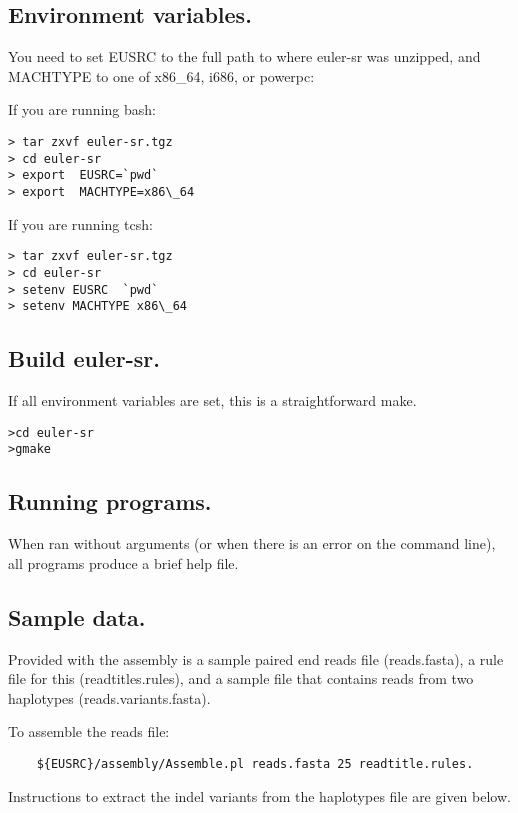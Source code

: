 \documentclass{article}[12pt]
\begin{document}
\subsection{ Environment variables.}

You need to set EUSRC to the full path to where euler-sr was unzipped,
and MACHTYPE to one of x86\_64, i686, or powerpc:

If you are running bash:


\begin{verbatim}
> tar zxvf euler-sr.tgz
> cd euler-sr
> export  EUSRC=`pwd`
> export  MACHTYPE=x86\_64
\end{verbatim}

If you are running tcsh:

\begin{verbatim}
> tar zxvf euler-sr.tgz
> cd euler-sr
> setenv EUSRC  `pwd`
> setenv MACHTYPE x86\_64
\end{verbatim}


\subsection{ Build euler-sr.  }

If all environment variables are set, this is a straightforward make.

\begin{verbatim}
>cd euler-sr
>gmake
\end{verbatim}


\subsection{Running programs.}

	 When ran without arguments (or when there is an error on the
	 command line), all programs produce a brief help file.


\subsection{Sample data.}
  Provided with the assembly is a sample paired end reads file
  (reads.fasta), a rule file for this (readtitles.rules), and a sample
  file that contains reads from two haplotypes (reads.variants.fasta).

	To assemble the reads file:
\begin{verbatim}
	${EUSRC}/assembly/Assemble.pl reads.fasta 25 readtitle.rules.
\end{verbatim}
	Instructions to extract the indel variants from the haplotypes file
	are given below.
\end{document}
